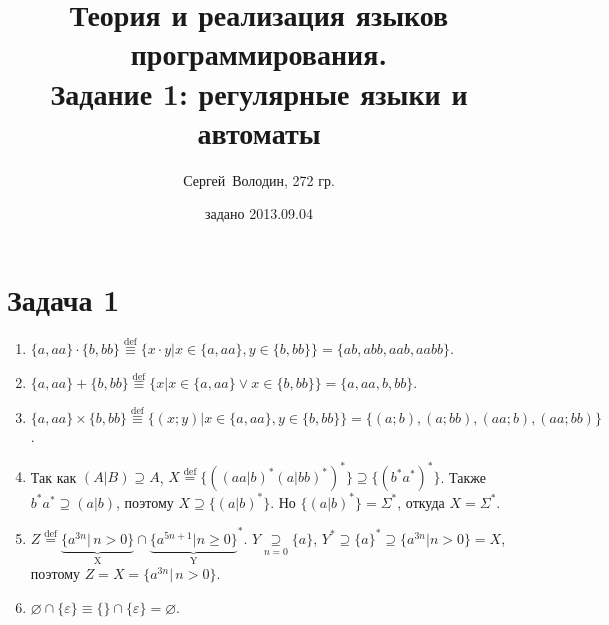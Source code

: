 \documentclass[a4paper]{article}
\title{Теория и реализация языков программирования.\\Задание 1: регулярные языки и автоматы}
\date{задано 2013.09.04}
\author{Сергей~Володин, 272 гр.}
\begin{document}
\maketitle
\section*{Задача 1}
\begin{enumerate}
\item $\{a,aa\}\cdot\{b,bb\}\overset{\mathrm{def}}{\equiv}\{x\cdot y|x\in \{a,aa\},y\in \{b,bb\}\}=\{ab,abb,aab,aabb\}.$
\item $\{a,aa\}+\{b,bb\}\overset{\mathrm{def}}{\equiv}\{x|x\in \{a,aa\} \vee x\in \{b,bb\}\}=\{a,aa,b,bb\}$.
\item $\{a,aa\}\times\{b,bb\}\overset{\mathrm{def}}{\equiv}\{(x;y)|x\in \{a,aa\}, y\in \{b,bb\}\}=\{(a;b),(a;bb),(aa;b),(aa;bb)\}$.
\item Так как $(A|B)\supseteq A$, $X\overset{\mathrm{def}}{=}\{((aa|b)^*(a|bb)^*)^*\}\supseteq \{(b^*a^*)^*\}$. Также $b^*a^*\supseteq (a|b)$, поэтому $X\supseteq \{(a|b)^*\}$. Но $\{(a|b)^*\}=\Sigma^*$, откуда $X=\Sigma^*$.
\item $Z\overset{\mathrm{def}}{=}\underbrace{\{ a^{3n} | \, n>0\}}_\text{X} \cap {\underbrace{\{ a^{5n+1} | n \geq 0\}}_\text{Y}}^*$. $Y\underset{n=0}{\supseteq} \{a\}$, $Y^*\supseteq\{a\}^*\supseteq \{a^{3n}|n>0\}=X$, поэтому $Z=X=\{ a^{3n} | \, n>0\}$.
\item $\varnothing\cap\{\varepsilon\}\equiv\{\}\cap\{\varepsilon\}=\varnothing$.
\end{enumerate}
\end{document}

